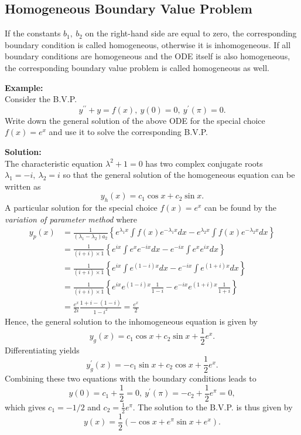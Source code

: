 \documentclass[11pt,a4paper,twoside]{article}
\begin{document}
	\subsection{Homogeneous Boundary Value Problem}
	If the constants $b_1,\ b_2$ on the right-hand side are equal to zero, the corresponding boundary condition is called homogeneous, otherwise it is inhomogeneous. If all boundary conditions are homogeneous and the ODE itself is also homogeneous, the corresponding boundary value problem is called homogeneous as well.\par
	\textbf{Example:}\\
	Consider the B.V.P.
	$$
	y^{\prime\prime} + y = f(x),\ y(0) = 0,\ y^\prime(\pi) = 0.
	$$
	Write down the general solution of the above ODE for the special choice $f(x) = e^x$ and use it to solve the corresponding B.V.P.\par
	\textbf{Solution:}\\
	The characteristic equation $\lambda^2 + 1 = 0$ has two complex conjugate roots $\lambda_1 = −i,\ \lambda_2 = i$ so that the general solution of the homogeneous equation can be written as
	$$
	y_h(x) = c_1\cos x + c_2 \sin x.
	$$
	A particular solution for the special choice $f(x) = e^x$ can be found by the \textit{variation of parameter method} where
	\begin{align*}
		y_p(x)
		&= \frac{1}{(\lambda_1 - \lambda_2)a_2}\left\{e^{\lambda_1x}\int f(x)e^{-\lambda_1x}dx - e^{\lambda_2x}\int f(x)e^{-\lambda_2 x}dx\right\}\\
		&= \frac{1}{(i+i)\times 1}\left\{e^{ix}\int e^xe^{-ix}dx - e^{-ix}\int e^xe^{ix}dx\right\}\\
		&= \frac{1}{(i+i)\times 1}\left\{e^{ix}\int e^{(1-i)x}dx - e^{-ix}\int e^{(1+i)x}dx\right\}\\
		&= \frac{1}{(i+i)\times 1}\left\{e^{ix}e^{(1-i)x}\frac{1}{1-i} - e^{-ix}e^{(1+i)x}\frac{1}{1+i}\right\}\\
		&= \frac{e^x}{2i}\frac{1+i - (1-i)}{1-i^2} = \frac{e^x}{2}
	\end{align*}
	Hence, the general solution to the inhomogeneous equation is given by
	$$
	y_g(x) = c_1\cos x + c_2\sin x + \frac{1}{2}e^x.
	$$
	Differentiating yields
	$$
	y^\prime_g(x) = -c_1\sin x + c_2\cos x + \frac{1}{2}e^x.
	$$
	Combining these two equations with the boundary conditions leads to
	$$
	y(0) = c_1 + \frac{1}{2} = 0,\ y^\prime(\pi) = -c_2+\frac{1}{2}e^\pi = 0,
	$$
	which gives $c_1 = −1/2$ and $c_2 = \frac{1}{2}e^\pi$. The solution to the B.V.P. is thus given by
	$$
	y(x) = \frac{1}{2}(-\cos x + e^\pi\sin x + e^x).
	$$
\end{document}
